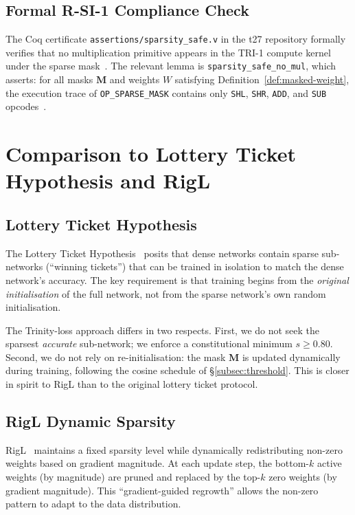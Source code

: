 \subsection{Formal R-SI-1 Compliance Check}
\label{subsec:rsi1-check}

The Coq certificate \texttt{assertions/sparsity\_safe.v} in the \textsf{t27}
repository formally verifies that no multiplication primitive appears in the
TRI-1 compute kernel under the sparse mask~\cite{blalock2020state}.  The
relevant lemma is \texttt{sparsity\_safe\_no\_mul}, which asserts: for all
masks $\mathbf{M}$ and weights $W$ satisfying
Definition~\ref{def:masked-weight}, the execution trace of
\texttt{OP\_SPARSE\_MASK} contains only \texttt{SHL}, \texttt{SHR}, \texttt{ADD},
and \texttt{SUB} opcodes~\cite{hanetal2015deep}.


\section{Comparison to Lottery Ticket Hypothesis and RigL}
\label{sec:lottery}

\subsection{Lottery Ticket Hypothesis}
\label{subsec:lth}

The Lottery Ticket Hypothesis~\cite{frankle2019lottery} posits that dense
networks contain sparse sub-networks (``winning tickets'') that can be trained
in isolation to match the dense network's accuracy.  The key requirement is
that training begins from the \emph{original initialisation} of the full network,
not from the sparse network's own random initialisation.

The Trinity-loss approach differs in two respects.  First, we do not seek the
sparsest \emph{accurate} sub-network; we enforce a constitutional minimum
$s \geq 0.80$.  Second, we do not rely on re-initialisation: the mask
$\mathbf{M}$ is updated dynamically during training, following the cosine
schedule of §\ref{subsec:threshold}.  This is closer in spirit to RigL
\cite{evci2020rigging} than to the original lottery ticket protocol.

\subsection{RigL Dynamic Sparsity}
\label{subsec:rigl}

RigL~\cite{evci2020rigging} maintains a fixed sparsity level while dynamically
redistributing non-zero weights based on gradient magnitude.  At each update
step, the bottom-$k$ active weights (by magnitude) are pruned and replaced by
the top-$k$ zero weights (by gradient magnitude).  This ``gradient-guided
regrowth'' allows the non-zero pattern to adapt to the data distribution.

